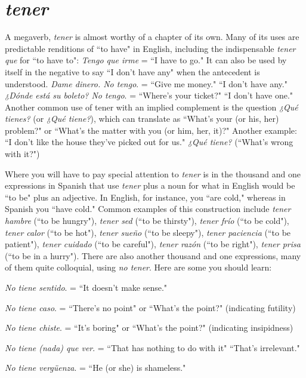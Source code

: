 \section{\emph{tener}}

A megaverb, \emph{tener} is almost worthy of a chapter of its own.
Many of its uses are predictable renditions of ``to have" in English, including the indispensable \emph{tener que} for ``to have to": \emph{Tengo que irme}
= ``I have to go." It can also be used by itself in the negative to say ``I
don't have any" when the antecedent is understood. \emph{Dame dinero. No
	tengo}. = ``Give me money." ``I don't have any." \emph{¿Dónde está su boleto?
	No tengo}. = ``Where's your ticket?" ``I don't have one." Another common use of tener with an implied complement is the question \emph{¿Qué
	tienes?} (or \emph{¿Qué tiene?}), which can translate as ``What's your (or his,
her) problem?" or ``What's the matter with you (or him, her, it)?" Another example: ``I don't like the house they've picked out for us." \emph{¿Qué
	tiene?} (``What's wrong with it?")

Where you will have to pay special attention to \emph{tener} is in the
thousand and one expressions in Spanish that use \emph{tener} plus a noun for
what in English would be ``to be" plus an adjective. In English, for instance, you ``are cold," whereas in Spanish you ``have cold." Common
examples of this construction include \emph{tener hambre} (``to be hungry"),
\emph{tener sed} (``to be thirsty"), \emph{tener frío} (``to be cold"), \emph{tener calor} (``to be
hot"), \emph{tener sueño} (``to be sleepy"), \emph{tener paciencia} (``to be patient"),
\emph{tener cuidado} (``to be careful"), \emph{tener razón} (``to be right"), \emph{tener prisa}
(``to be in a hurry").
There are also another thousand and one expressions, many of
them quite colloquial, using \emph{no tener}. Here are some you should learn:

\bsk

\indu \emph{No tiene sentido}. = ``It doesn't make sense."

\indu \emph{No tiene caso}. = ``There's no point" or ``What's the point?"
(indicating futility)

\indu \emph{No tiene chiste}. = ``It's boring" or ``What's the point?" (indicating insipidness)

\indu \emph{No tiene (nada) que ver}. = ``That has nothing to do with it"
``That's irrelevant."

\indu \emph{No tiene vergüenza}. = ``He (or she) is shameless."


